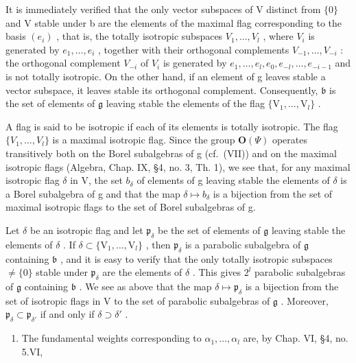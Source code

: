 It is immediately verified that the only vector subspaces of V distinct from \(\{0\}\) and V stable under b are the elements of the maximal flag corresponding to the basis \((e_{i})\) , that is, the totally isotropic subspaces \(V_{1},\ldots,V_{l}\) , where \(V_{i}\) is generated by \(e_{1},\ldots,e_{i}\) , together with their orthogonal complements \(V_{-1},\ldots,V_{-i}\) : the orthogonal complement \(V_{-i}\) of \(V_{i}\) is generated by \(e_{1},\ldots,e_{l},e_{0},e_{-l},\ldots,e_{-i-1}\) and is not totally isotropic. On the other hand, if an element of g leaves stable a vector subspace, it leaves stable its orthogonal complement. Consequently, \(\mathfrak{b}\) is the set of elements of \(\mathfrak{g}\) leaving stable the elements of the flag \(\{\mathrm{V}_1,\dots ,\mathrm{V}_l\}\) .

A flag is said to be isotropic if each of its elements is totally isotropic. The flag \(\{V_{1},\ldots,V_{l}\}\) is a maximal isotropic flag. Since the group \(\mathbf{O}(\varPsi)\) operates transitively both on the Borel subalgebras of g (cf.~(VII)) and on the maximal isotropic flags (Algebra, Chap. IX, §4, no. 3, Th. 1), we see that, for any maximal isotropic flag \(\delta\) in V, the set \(b_{\delta}\) of elements of g leaving stable the elements of \(\delta\) is a Borel subalgebra of g and that the map \(\delta\mapsto b_{\delta}\) is a bijection from the set of maximal isotropic flags to the set of Borel subalgebras of g.

Let \(\delta\) be an isotropic flag and let \(\mathfrak{p}_{\delta}\) be the set of elements of \(\mathfrak{g}\) leaving stable the elements of \(\delta\) . If \(\delta \subset \{\mathrm{V}_1, \ldots, \mathrm{V}_l\}\) , then \(\mathfrak{p}_{\delta}\) is a parabolic subalgebra of \(\mathfrak{g}\) containing \(\mathfrak{b}\) , and it is easy to verify that the only totally isotropic subspaces \(\neq \{0\}\) stable under \(\mathfrak{p}_{\delta}\) are the elements of \(\delta\) . This gives \(2^l\) parabolic subalgebras of \(\mathfrak{g}\) containing \(\mathfrak{b}\) . We see as above that the map \(\delta \mapsto \mathfrak{p}_{\delta}\) is a bijection from the set of isotropic flags in V to the set of parabolic subalgebras of \(\mathfrak{g}\) . Moreover, \(\mathfrak{p}_{\delta} \subset \mathfrak{p}_{\delta'}\) if and only if \(\delta \supset \delta'\) .

\begin{enumerate}
\def\labelenumi{(\Roman{enumi})}
\setcounter{enumi}{3}
\tightlist
\item
  The fundamental weights corresponding to \(\alpha_{1},\ldots,\alpha_{l}\) are, by Chap. VI, §4, no. 5.VI,
\end{enumerate}

